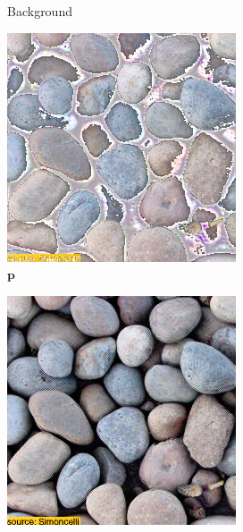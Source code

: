 \begin{figure}[]
\begin{subfigure}{\textwidth}
\begin{subfigure}{0.24\textwidth}
            \caption{Background}
            \label{fig:ex01-pebbles-1000steps-threshold_bg}
        \end{subfigure}
        \hfill
        \begin{subfigure}{0.24\textwidth}
            \centering
            \includegraphics[width=\textwidth]{images/04-experiment01/pebbles/1000/threshold_im.jpg}
            \caption{\(\bm{p}\)}
            \label{fig:ex01-pebbles-1000steps-threshold_im}
        \end{subfigure}
        \hfill
        \begin{subfigure}{0.24\textwidth}
            \centering
            \includegraphics[width=\textwidth]{images/04-experiment01/pebbles/1000/threshold_proj.jpg}

\end{subfigure}
\end{subfigure}
\end{figure}
